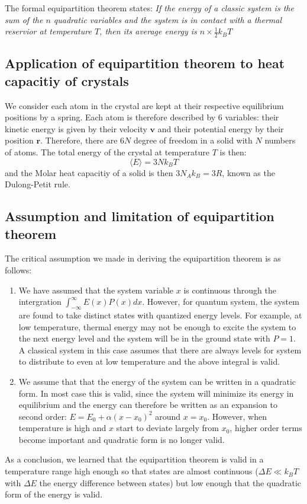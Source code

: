 \documentclass{article}
\begin{document}
The formal equipartition theorem states: \emph{ If the energy of a classic system is the sum
of the $n$ quadratic variables and the system is in contact with a thermal reservior at temperature $T$, 
then its average energy is $n\times \frac{1}{2}k_B T$}

\subsection*{Application of equipartition theorem to heat capacitiy of crystals}
We consider each atom in the crystal are kept at their respective equilibrium positions
by a spring. Each atom is therefore described by 6 variables: their kinetic energy
is given by their velocity $\mathbf{v}$ and their potential energy by their 
position $\mathbf{r}$. Therefore, there are $6N$ degree of freedom in a solid 
with $N$ numbers of atoms. The total energy of the crystal at temperature $T$
is then:
\begin{equation}
    \langle E \rangle = 3N k_B T
\end{equation}
and the Molar heat capacitiy of a solid is then $3N_A k_B = 3R$, known as the Dulong-Petit rule.

\subsection*{Assumption and limitation of equipartition theorem}
The critical assumption we made in deriving the equipartition theorem is 
as follows:
\begin{enumerate}
    \item We have assumed that the system variable $x$ is continuous through the intergration $\int_{-\infty}^{\infty} E(x) P(x) dx$.
            However, for quantum system, the system are found to take distinct states with quantized energy levels. For example, at low temperature,
            thermal energy may not be enough to excite the system to the next energy level and the system will be in the ground state with $P = 1$.
            A classical system in this case assumes that there are always levels for system to distribute to even at low temperature and the above 
            integral is valid. 
    \item We assume that that the energy of the system can be written in a quadratic form. In most case this is valid, since the system will 
            minimize its energy in equilibrium and the energy can therefore be written as an expansion to second order: $ E = E_0 + \alpha (x - x_0)^2$ 
            around $x =x_0$. However, when temperature is high and $x$ start to deviate largely from $x_0$, 
            higher order terms become important and quadratic form is no longer valid.
\end{enumerate}
As a conclusion, we learned that the equipartition theorem is valid in a temperature range high enough so that states are almost continuous ($\Delta E \ll k_B T$ with
$\Delta E$ the energy difference between states) but 
low enough that the quadratic form of the energy is valid.
\end{document}
